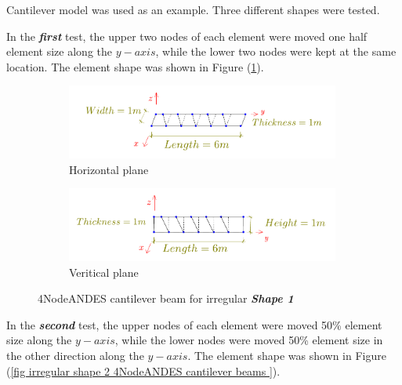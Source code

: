 \documentclass[fleqn,11pt,letter]{article}
\begin{document}
Cantilever model was used as an example. 
Three different shapes were tested. 


In the \emph{\textbf{first}} test, the upper two nodes of each element were moved one half element size along the $y-axis$, while the lower two nodes were kept at the same location. The element shape was shown in Figure (\ref{fig irregular shape 1 4NodeANDES cantilever beams }).


\begin{figure}[H]
  \centering
    \begin{subfigure}{0.5\textwidth}
      \centering
      \includegraphics[width=9cm]{../Figure_files/4NodeANDES/beam_ANDES_xy_bending_pureshape1.pdf}
      \caption{Horizontal plane}
    \end{subfigure}
    \begin{subfigure}{0.5\textwidth}
      \centering
      \includegraphics[width=9cm]{../Figure_files/4NodeANDES/beam_ANDES_yz_inPlane_pureshape1.pdf}
      \caption{Veritical  plane}
    \end{subfigure}
  \caption{4NodeANDES cantilever beam for irregular \textbf{\emph{Shape 1}} }
  \label{fig irregular shape 1 4NodeANDES cantilever beams }
\end{figure}





In the \emph{\textbf{second}} test, the upper nodes of each element were moved 50\% element size along the $y-axis$, while the lower nodes were moved 50\% element size in the other direction along the $y-axis$. The element shape was shown in Figure (\ref{fig irregular shape 2 4NodeANDES cantilever beams }).
\end{document}
